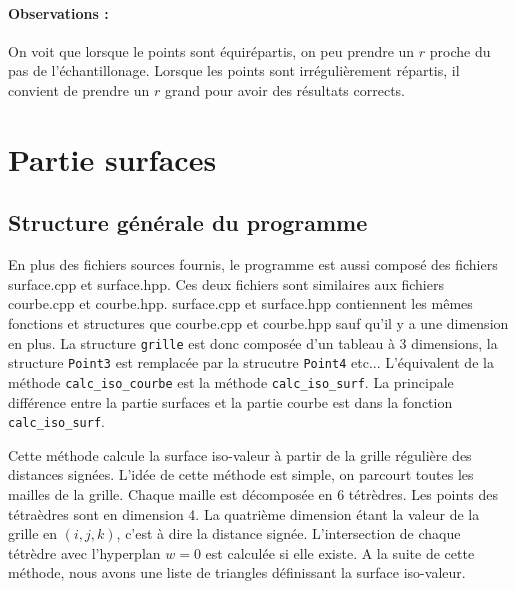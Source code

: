 \documentclass[11pt,a4paper]{article}
\begin{document}
\paragraph{Observations :}
On voit que lorsque le points sont équirépartis, on peu prendre un $r$ proche du pas de l'échantillonage. Lorsque les points sont irrégulièrement
répartis, il convient de prendre un $r$ grand pour avoir des résultats corrects.


\pagebreak

\section{Partie surfaces}
\subsection{Structure générale du programme}
En plus des fichiers sources fournis, le programme est aussi composé des fichiers surface.cpp et surface.hpp. Ces deux fichiers
sont similaires aux fichiers courbe.cpp et courbe.hpp. surface.cpp et surface.hpp contiennent les mêmes fonctions et structures que
courbe.cpp et courbe.hpp sauf qu'il y a une dimension en plus. La structure {\tt grille} est donc composée d'un tableau à 3 dimensions,
la structure {\tt Point3} est remplacée par la strucutre {\tt Point4} etc... L'équivalent de la méthode {\tt calc\_iso\_courbe} est la méthode
{\tt calc\_iso\_surf}. La principale différence entre la partie surfaces et la partie courbe est dans la fonction {\tt calc\_iso\_surf}.

Cette méthode calcule la surface iso-valeur à partir de la grille régulière des distances signées. L'idée de cette méthode est simple, on parcourt
toutes les mailles de la grille. Chaque maille est décomposée en 6 tétrèdres. Les points des tétraèdres sont en dimension 4. La quatrième dimension
étant la valeur de la grille en $(i,j,k)$, c'est à dire la distance signée. L'intersection de chaque tétrèdre avec l'hyperplan $w=0$ est calculée si elle existe.
A la suite de cette méthode, nous avons une liste de triangles définissant la surface iso-valeur.
\end{document}
